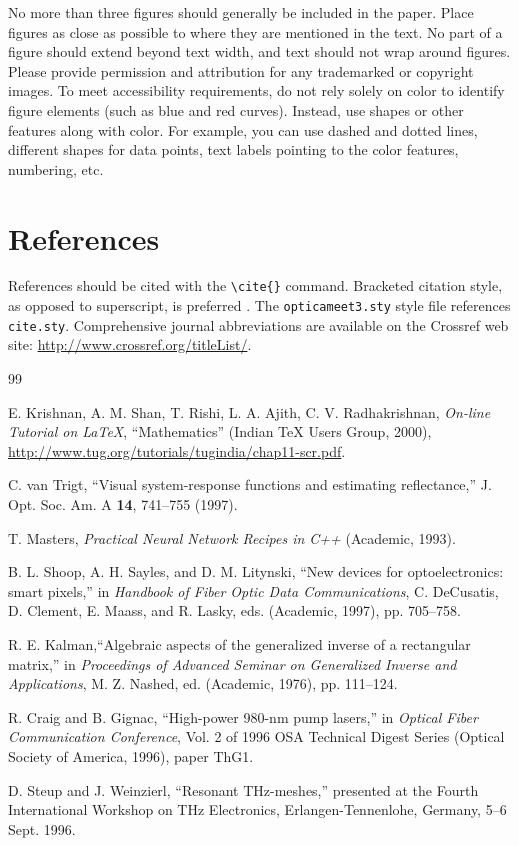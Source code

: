 \documentclass[letterpaper,10pt]{article}
\begin{document}
No more than three figures should generally be included in the paper. Place figures as close as possible to where they are mentioned in the text. No part of a figure should extend beyond text width, and text should not wrap around figures. Please provide permission and attribution for any trademarked or copyright images.
To meet accessibility requirements, do not rely solely on color to identify figure elements (such as blue and red curves). Instead, use shapes or other features along with color. For example, you can use dashed and dotted lines, different shapes for data points, text labels pointing to the color features, numbering, etc.

\section{References}
References should be cited with the \verb+\cite{}+ command.
Bracketed citation style, as opposed to superscript, is preferred
\cite{krishnan00,vantrigt97,masters93,shoop97,kalman76,craig96,steup96}.
The \texttt{opticameet3.sty} style file references \texttt{cite.sty}. Comprehensive journal abbreviations are available on the Crossref web site:
\href{http://www.crossref.org/titleList/}{http://www.crossref.org/titleList/}.

\begin{thebibliography}{99} %



 E. Krishnan, A. M. Shan, T. Rishi, L. A. Ajith, C. V.
Radhakrishnan, \textit{On-line Tutorial on \LaTeX{}},
``Mathematics'' (Indian \TeX{} Users Group, 2000), \\
\url{http://www.tug.org/tutorials/tugindia/chap11-scr.pdf}.

 C. van Trigt, ``Visual system-response functions and estimating reflectance,''
J. Opt. Soc. Am. A \textbf{14}, 741--755 (1997).

 T. Masters, \emph{Practical Neural Network Recipes in C++} (Academic, 1993).

 B. L. Shoop, A. H. Sayles, and D. M. Litynski, ``New devices for optoelectronics: smart pixels,''
in \emph{Handbook of Fiber Optic Data Communications},
C. DeCusatis, D. Clement, E. Maass, and R. Lasky, eds. (Academic, 1997), pp. 705--758.

 R. E. Kalman,``Algebraic aspects of the generalized inverse of a rectangular matrix,'' in
\emph{Proceedings of Advanced Seminar on Generalized Inverse and Applications}, M. Z. Nashed, ed. (Academic, 1976), pp. 111--124.

 R. Craig and B. Gignac, ``High-power 980-nm pump lasers,''
in \emph{Optical Fiber Communication Conference}, Vol. 2 of 1996 OSA Technical Digest Series (Optical Society of America, 1996), paper ThG1.

 D. Steup and J. Weinzierl, ``Resonant THz-meshes,''
presented at the Fourth International Workshop on THz Electronics, Erlangen-Tennenlohe, Germany, 5--6 Sept. 1996.

\end{thebibliography}
\end{document}
